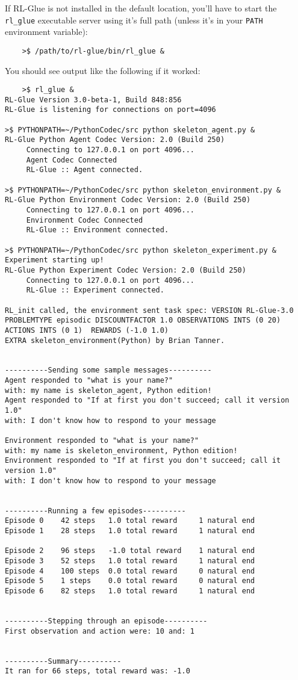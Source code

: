 \documentclass[11pt]{article}
\begin{document}
If RL-Glue is not installed in the default location, you'll have to start the \texttt{rl\_glue} executable server using it's full path (unless it's in your \texttt{PATH} environment variable):
\begin{verbatim}
	>$ /path/to/rl-glue/bin/rl_glue &
\end{verbatim}

You should see output like the following if it worked:
\begin{verbatim}
	>$ rl_glue &
RL-Glue Version 3.0-beta-1, Build 848:856
RL-Glue is listening for connections on port=4096

>$ PYTHONPATH=~/PythonCodec/src python skeleton_agent.py &
RL-Glue Python Agent Codec Version: 2.0 (Build 250)
     Connecting to 127.0.0.1 on port 4096...
     Agent Codec Connected
     RL-Glue :: Agent connected.

>$ PYTHONPATH=~/PythonCodec/src python skeleton_environment.py &
RL-Glue Python Environment Codec Version: 2.0 (Build 250)
     Connecting to 127.0.0.1 on port 4096...
     Environment Codec Connected
     RL-Glue :: Environment connected.

>$ PYTHONPATH=~/PythonCodec/src python skeleton_experiment.py &
Experiment starting up!
RL-Glue Python Experiment Codec Version: 2.0 (Build 250)
     Connecting to 127.0.0.1 on port 4096...
     RL-Glue :: Experiment connected.

RL_init called, the environment sent task spec: VERSION RL-Glue-3.0 
PROBLEMTYPE episodic DISCOUNTFACTOR 1.0 OBSERVATIONS INTS (0 20) 
ACTIONS INTS (0 1)  REWARDS (-1.0 1.0)  
EXTRA skeleton_environment(Python) by Brian Tanner.


----------Sending some sample messages----------
Agent responded to "what is your name?" 
with: my name is skeleton_agent, Python edition!
Agent responded to "If at first you don't succeed; call it version 1.0" 
with: I don't know how to respond to your message

Environment responded to "what is your name?" 
with: my name is skeleton_environment, Python edition!
Environment responded to "If at first you don't succeed; call it version 1.0" 
with: I don't know how to respond to your message


----------Running a few episodes----------
Episode 0	 42 steps 	1.0 total reward	 1 natural end
Episode 1	 28 steps 	1.0 total reward	 1 natural end

Episode 2	 96 steps 	-1.0 total reward	 1 natural end
Episode 3	 52 steps 	1.0 total reward	 1 natural end
Episode 4	 100 steps 	0.0 total reward	 0 natural end
Episode 5	 1 steps 	0.0 total reward	 0 natural end
Episode 6	 82 steps 	1.0 total reward	 1 natural end


----------Stepping through an episode----------
First observation and action were: 10 and: 1


----------Summary----------
It ran for 66 steps, total reward was: -1.0
\end{verbatim}
\end{document}
